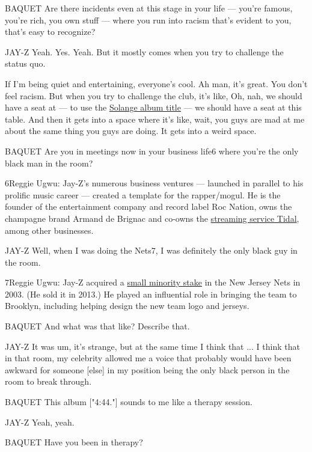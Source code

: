 BAQUET Are there incidents even at this stage in your life --- you're
famous, you're rich, you own stuff --- where you run into racism that's
evident to you, that's easy to recognize?

JAY-Z Yeah. Yes. Yeah. But it mostly comes when you try to challenge the
status quo.

If I'm being quiet and entertaining, everyone's cool. Ah man, it's
great. You don't feel racism. But when you try to challenge the club,
it's like, Oh, nah, we should have a seat at --- to use the
\href{https://open.spotify.com/album/3Yko2SxDk4hc6fncIBQlcM}{Solange
album title} --- we should have a seat at this table. And then it gets
into a space where it's like, wait, you guys are mad at me about the
same thing you guys are doing. It gets into a weird space.

BAQUET Are you in meetings now in your business life6 where you're the
only black man in the room?

6Reggie Ugwu: Jay-Z's numerous business ventures --- launched in
parallel to his prolific music career --- created a template for the
rapper/mogul. He is the founder of the entertainment company and record
label Roc Nation, owns the champagne brand Armand de Brignac and co-owns
the
\href{https://www.nytimes3xbfgragh.onion/2015/03/31/business/media/jay-z-reveals-plans-for-tidal-a-streaming-music-service.html}{streaming
service Tidal}, among other businesses.

JAY-Z Well, when I was doing the Nets7, I was definitely the only black
guy in the room.

7Reggie Ugwu: Jay-Z acquired a
\href{http://www.nytimes3xbfgragh.onion/2012/08/16/nyregion/with-the-nets-jay-z-rewrites-the-celebrity-investors-playbook.html}{small
minority stake} in the New Jersey Nets in 2003. (He sold it in 2013.) He
played an influential role in bringing the team to Brooklyn, including
helping design the new team logo and jerseys.

BAQUET And what was that like? Describe that.

JAY-Z It was um, it's strange, but at the same time I think that ... I
think that in that room, my celebrity allowed me a voice that probably
would have been awkward for someone {[}else{]} in my position being the
only black person in the room to break through.

BAQUET This album {[}"4:44."{]} sounds to me like a therapy session.

JAY-Z Yeah, yeah.

BAQUET Have you been in therapy?


